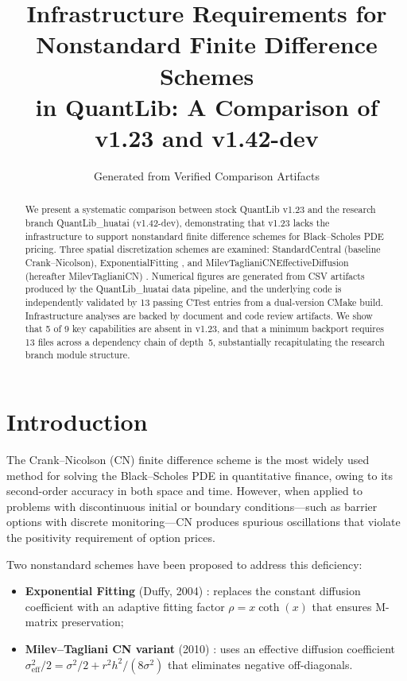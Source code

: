 \documentclass[11pt]{article}
\title{Infrastructure Requirements for Nonstandard Finite Difference Schemes\\
       in QuantLib: A Comparison of v1.23 and v1.42-dev}
\author{Generated from Verified Comparison Artifacts}
\date{}
\begin{document}
\maketitle

\begin{abstract}
We present a systematic comparison between stock QuantLib v1.23 and the
research branch QuantLib\_huatai (v1.42-dev), demonstrating that v1.23
lacks the infrastructure to support nonstandard finite difference schemes
for Black--Scholes PDE pricing. Three spatial discretization schemes are
examined: StandardCentral (baseline Crank--Nicolson), ExponentialFitting
\cite{Duffy2004}, and MilevTaglianiCNEffectiveDiffusion (hereafter
MilevTaglianiCN) \cite{MilevTagliani2010a,MilevTagliani2010b}.
Numerical figures are generated from CSV artifacts produced by the
QuantLib\_huatai data pipeline, and the underlying code is independently
validated by 13 passing CTest entries from a dual-version CMake build.
Infrastructure analyses are backed by document and code review artifacts.
We show that 5 of 9 key capabilities are absent in v1.23, and
that a minimum backport requires 13 files across a dependency chain of
depth~5, substantially recapitulating the research branch module structure.
\end{abstract}

\section{Introduction}
\label{sec:intro}

The Crank--Nicolson (CN) finite difference scheme \cite{CrankNicolson1947}
is the most widely used method for solving the Black--Scholes PDE in
quantitative finance, owing to its second-order accuracy in both space
and time. However, when applied to problems with discontinuous initial or
boundary conditions---such as barrier options with discrete monitoring---CN
produces spurious oscillations that violate the positivity requirement of
option prices.

Two nonstandard schemes have been proposed to address this deficiency:
\begin{itemize}
  \item \textbf{Exponential Fitting} (Duffy, 2004) \cite{Duffy2004}:
    replaces the constant diffusion coefficient with an adaptive fitting
    factor $\rho = x\coth(x)$ that ensures M-matrix preservation;
  \item \textbf{Milev--Tagliani CN variant} (2010)
    \cite{MilevTagliani2010a,MilevTagliani2010b}: uses an effective
    diffusion coefficient $\sigma_{\mathrm{eff}}^2/2 = \sigma^2/2 +
    r^2 h^2/(8\sigma^2)$ that eliminates negative off-diagonals.
\end{itemize}
\end{document}

